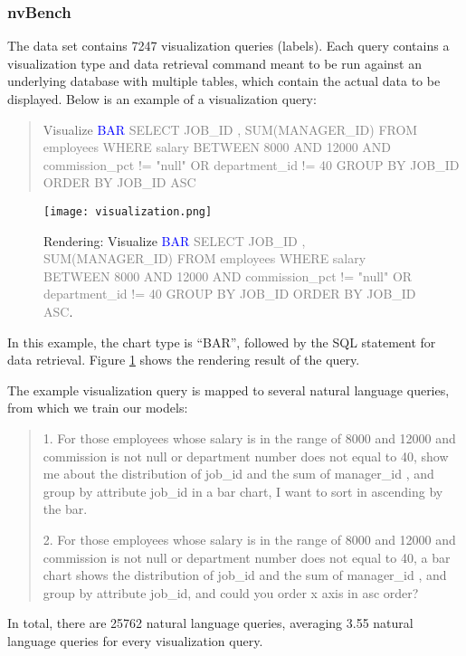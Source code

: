 \documentclass[
	a4paper, %
	10pt, %
	unnumberedsections, %
	twoside, %
]{t0003}
\newcommand{\blue}[1]{\textcolor{blue}{#1}}
\newcommand{\gray}[1]{\textcolor{gray}{#1}}
\begin{document}
\subsubsection{nvBench} The data set contains 7247 visualization queries (labels). Each query contains a visualization type and data retrieval command meant to be run against an underlying database with multiple tables, which contain the actual data to be displayed. Below is an example of a visualization query:

\begin{quote}
Visualize \blue{BAR} \gray{SELECT JOB\_ID , SUM(MANAGER\_ID) FROM employees WHERE salary BETWEEN 8000 AND 12000 AND commission\_pct != "null" OR department\_id != 40 GROUP BY JOB\_ID ORDER BY JOB\_ID ASC}
\end{quote}

\begin{figure}
	\texttt{[image: visualization.png]}
	\caption{Rendering: Visualize \blue{BAR} \gray{SELECT JOB\_ID , SUM(MANAGER\_ID) FROM employees WHERE salary BETWEEN 8000 AND 12000 AND commission\_pct != "null" OR department\_id != 40 GROUP BY JOB\_ID ORDER BY JOB\_ID ASC}.}
	\label{fig:visualization}
\end{figure}

In this example, the chart type is ``BAR'', followed by the SQL statement for data retrieval. Figure \ref{fig:visualization} shows the rendering result of the query.

The example visualization query is mapped to several natural language queries, from which we train our models:

\begin{quote}
1. For those employees whose salary is in the range of 8000 and 12000 and commission is not null or department number does not equal to 40, show me about the distribution of job\_id and the sum of manager\_id , and group by attribute job\_id in a bar chart, I want to sort in ascending by the bar.

2. For those employees whose salary is in the range of 8000 and 12000 and commission is not null or department number does not equal to 40, a bar chart shows the distribution of job\_id and the sum of manager\_id , and group by attribute job\_id, and could you order x axis in asc order?
\end{quote}

In total, there are 25762 natural language queries, averaging 3.55 natural language queries for every visualization query.
\end{document}
